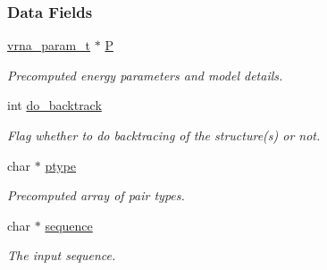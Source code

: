 \subsubsection*{Data Fields}
\begin{DoxyCompactItemize}
\item 
\mbox{\label{group__kl__neighborhood__mfe_a70da9e83ad87c37013b4bf0b265dd307}} 
\hyperlink{group__energy__parameters_ga8a69ca7d787e4fd6079914f5343a1f35}{vrna\+\_\+param\+\_\+t} $\ast$ \hyperlink{group__kl__neighborhood__mfe_a70da9e83ad87c37013b4bf0b265dd307}{P}
\begin{DoxyCompactList}\small\item\em Precomputed energy parameters and model details. \end{DoxyCompactList}\item 
\mbox{\label{group__kl__neighborhood__mfe_ade5c7e9337a458ae20bac75abdc52d64}} 
int \hyperlink{group__kl__neighborhood__mfe_ade5c7e9337a458ae20bac75abdc52d64}{do\+\_\+backtrack}
\begin{DoxyCompactList}\small\item\em Flag whether to do backtracing of the structure(s) or not. \end{DoxyCompactList}\item 
\mbox{\label{group__kl__neighborhood__mfe_aedf60b8b26dae05ad266d3e098d18208}} 
char $\ast$ \hyperlink{group__kl__neighborhood__mfe_aedf60b8b26dae05ad266d3e098d18208}{ptype}
\begin{DoxyCompactList}\small\item\em Precomputed array of pair types. \end{DoxyCompactList}\item 
\mbox{\label{group__kl__neighborhood__mfe_a3596f3d4d320318c4b8428e2abc7ab56}} 
char $\ast$ \hyperlink{group__kl__neighborhood__mfe_a3596f3d4d320318c4b8428e2abc7ab56}{sequence}
\begin{DoxyCompactList}\small\item\em The input sequence. \end{DoxyCompactList}\item 
\mbox{\label{group__kl__neighborhood__mfe_ab9ee459ffbfb5d2c138a033516056cdc}} 

\end{DoxyCompactItemize}
